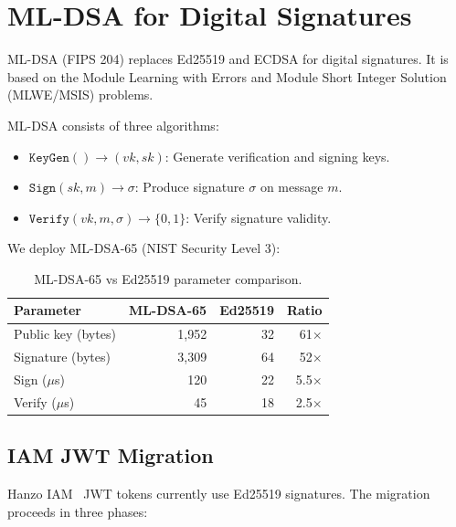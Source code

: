 \section{ML-DSA for Digital Signatures}

\label{sec:mldsa}

ML-DSA (FIPS 204) replaces Ed25519 and ECDSA for digital signatures. It is
based on the Module Learning with Errors and Module Short Integer Solution
(MLWE/MSIS) problems.

\begin{definition}[ML-DSA]
ML-DSA consists of three algorithms:
\begin{itemize}[leftmargin=1.1em]
    \item $\texttt{KeyGen}() \to (vk, sk)$: Generate verification and
    signing keys.
    \item $\texttt{Sign}(sk, m) \to \sigma$: Produce signature $\sigma$ on
    message $m$.
    \item $\texttt{Verify}(vk, m, \sigma) \to \{0, 1\}$: Verify signature
    validity.
\end{itemize}
\end{definition}

We deploy ML-DSA-65 (NIST Security Level 3):

\begin{table}[H]
\centering
\small
\begin{tabular}{lrrr}
\toprule
\textbf{Parameter} & \textbf{ML-DSA-65} & \textbf{Ed25519} & \textbf{Ratio} \\
\midrule
Public key (bytes) & 1,952 & 32 & 61$\times$ \\
Signature (bytes) & 3,309 & 64 & 52$\times$ \\
Sign ($\mu$s) & 120 & 22 & 5.5$\times$ \\
Verify ($\mu$s) & 45 & 18 & 2.5$\times$ \\
\bottomrule
\end{tabular}
\caption{ML-DSA-65 vs Ed25519 parameter comparison.}
\label{tab:mldsa}
\end{table}

\subsection{IAM JWT Migration}

Hanzo IAM~\cite{hanzoiam} JWT tokens currently use Ed25519 signatures.
The migration proceeds in three phases:

